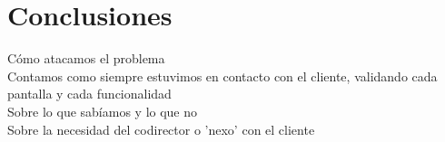 \section{Conclusiones}
Cómo atacamos el problema\\
Contamos como siempre estuvimos en contacto con el cliente, validando cada pantalla y cada funcionalidad\\
Sobre lo que sabíamos y lo que no\\
Sobre la necesidad del codirector o 'nexo' con el cliente